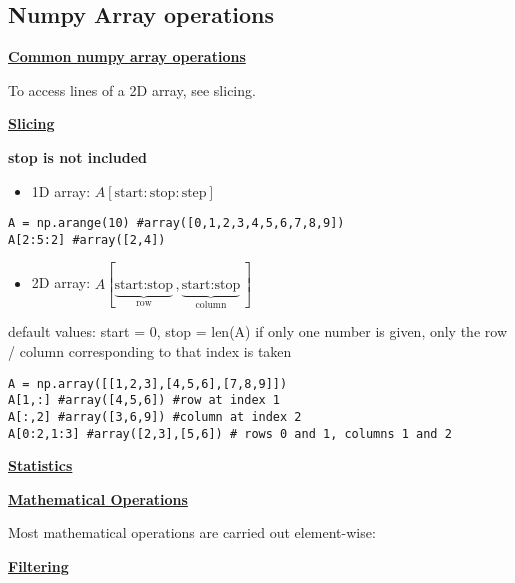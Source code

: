 \subsection{Numpy Array operations}
{\centering\underline{\textbf{Common numpy array operations}} \par}

To access lines of a 2D array, see slicing.

{\centering\underline{\textbf{Slicing}} \par}
{\centering\textbf{stop is not included} \par}
\begin{itemize}
       \item 1D array: $A[\text{start}:\text{stop}:\text{step}]$
\end{itemize}
\begin{lstlisting}
A = np.arange(10) #array([0,1,2,3,4,5,6,7,8,9])
A[2:5:2] #array([2,4])
\end{lstlisting}

\begin{itemize}
       \item 2D array: $A[\underbrace{\text{start}:\text{stop}}_{\text{row}}, \underbrace{\text{start}:\text{stop}}_{\text{column}}]$
\end{itemize}
default values: start = 0, stop = len(A)
if only one number is given, only the row / column corresponding to that index is taken
\begin{lstlisting}
A = np.array([[1,2,3],[4,5,6],[7,8,9]])
A[1,:] #array([4,5,6]) #row at index 1
A[:,2] #array([3,6,9]) #column at index 2
A[0:2,1:3] #array([2,3],[5,6]) # rows 0 and 1, columns 1 and 2
\end{lstlisting}

{\centering\underline{\textbf{Statistics}} \par}


{\centering\underline{\textbf{Mathematical Operations}} \par}
Most mathematical operations are carried out element-wise:


{\centering\underline{\textbf{Filtering}} \par}
